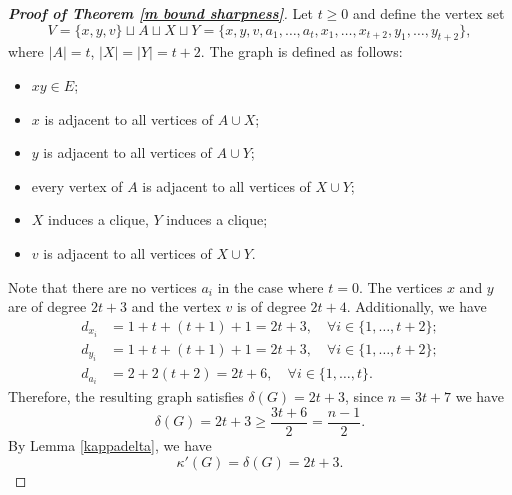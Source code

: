 \documentclass[10pt,a4paper]{article}
\theoremstyle{definition}
\theoremstyle{definition}
\theoremstyle{nonumber}
\begin{document}
\begin{proof}[\bf{Proof of Theorem \ref{m bound sharpness}}]
Let $t\geq0$ and define the vertex set
$$
V =\{x,y,v\}\sqcup A \sqcup X \sqcup Y = \{x, y, v, a_1, \dots, a_t, x_1, \dots, x_{t+2}, y_1, \dots, y_{t+2}\},
$$
where $|A|=t$, $|X|=|Y|=t+2$.
The graph is defined as follows:
\begin{itemize}
\item $xy\in E$;
\item $x$ is adjacent to all vertices of $A\cup X$;
\item $y$ is adjacent to all vertices of $A\cup Y$;
\item every vertex of $A$ is adjacent to all vertices of $X\cup Y$;
\item $X$ induces a clique, $Y$ induces a clique;
\item $v$ is adjacent to all vertices of $X\cup Y$.
\end{itemize}
Note that there are no vertices $a_i$ in the case where $t = 0$. The vertices $x$ and $y$ are of degree $2t+3$ and the vertex $v$ is of degree $2t+4$.
Additionally, we have
\begin{align*}
d_{x_i} &= 1 + t + (t+1) + 1= 2t+3,\quad \forall i \in \{1, \dots, t+2\};\\
d_{y_i} &= 1 + t + (t+1) + 1= 2t+3,\quad \forall i \in \{1, \dots, t+2\};\\
d_{a_i} &= 2 + 2(t+2)= 2t + 6,\quad \forall i \in \{1, \dots, t\}.
\end{align*}
Therefore, the resulting graph satisfies $\delta(G) = 2t+3$, since $n = 3t + 7$ we have
$$
\delta(G) =2t+3\geq \frac{3t+6}{2} =\frac{n-1}{2}.
$$
By Lemma \ref{kappadelta}, we have
$$\kappa'(G)=\delta(G)=2t+3.$$


\end{proof}
\end{document}
